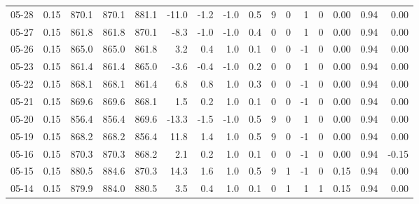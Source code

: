 \begin{threeparttable}
{\begin{tabular}{lrrrrrrrrrrrrrrr}
  05-28 &     0.15 & 870.1 & 870.1 & 881.1 &      -11.0 &           -1.2 &                     -1.0 &                 0.5 &              9 &         0 &     1 &         0 &       0.00 &      0.94 &           0.00 \\
  05-27 &     0.15 & 861.8 & 861.8 & 870.1 &       -8.3 &           -1.0 &                     -1.0 &                 0.4 &              0 &         0 &     1 &         0 &       0.00 &      0.94 &           0.00 \\
  05-26 &     0.15 & 865.0 & 865.0 & 861.8 &        3.2 &            0.4 &                      1.0 &                 0.1 &              0 &         0 &    -1 &         0 &       0.00 &      0.94 &           0.00 \\
  05-23 &     0.15 & 861.4 & 861.4 & 865.0 &       -3.6 &           -0.4 &                     -1.0 &                 0.2 &              0 &         0 &     1 &         0 &       0.00 &      0.94 &           0.00 \\
  05-22 &     0.15 & 868.1 & 868.1 & 861.4 &        6.8 &            0.8 &                      1.0 &                 0.3 &              0 &         0 &    -1 &         0 &       0.00 &      0.94 &           0.00 \\
  05-21 &     0.15 & 869.6 & 869.6 & 868.1 &        1.5 &            0.2 &                      1.0 &                 0.1 &              0 &         0 &    -1 &         0 &       0.00 &      0.94 &           0.00 \\
  05-20 &     0.15 & 856.4 & 856.4 & 869.6 &      -13.3 &           -1.5 &                     -1.0 &                 0.5 &              9 &         0 &     1 &         0 &       0.00 &      0.94 &           0.00 \\
  05-19 &     0.15 & 868.2 & 868.2 & 856.4 &       11.8 &            1.4 &                      1.0 &                 0.5 &              9 &         0 &    -1 &         0 &       0.00 &      0.94 &           0.00 \\
  05-16 &     0.15 & 870.3 & 870.3 & 868.2 &        2.1 &            0.2 &                      1.0 &                 0.1 &              0 &         0 &    -1 &         0 &       0.00 &      0.94 &          -0.15 \\
  05-15 &     0.15 & 880.5 & 884.6 & 870.3 &       14.3 &            1.6 &                      1.0 &                 0.5 &              9 &         1 &    -1 &         0 &       0.15 &      0.94 &           0.00 \\
  05-14 &     0.15 & 879.9 & 884.0 & 880.5 &        3.5 &            0.4 &                      1.0 &                 0.1 &              0 &         1 &     1 &         1 &       0.15 &      0.94 &           0.00 \\

\end{tabular}}
\end{threeparttable}
